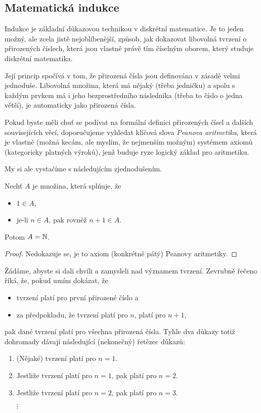\subsection{Matematická indukce}
\label{ssec:matematicka-indukce}

Indukce je základní důkazovou technikou v diskrétní matematice. Je to jeden
možný, ale zcela jistě nejoblíbenější, způsob, jak dokazovat libovolná tvrzení o
přirozených číslech, která jsou vlastně právě tím číselným oborem, který studuje
diskrétní matematika.

Její princip spočívá v tom, že přirozená čísla jsou definována v zásadě velmi
jednoduše. Libovolná množina, která má nějaký  (třeba
jedničku) a spolu s každým prvkem má i jeho bezprostředního následníka (třeba to
číslo o jedna větší), je automaticky  jako přirozená čísla.

Pokud byste měli chuť se podívat na formální definici přirozených čísel a
dalších souvisejících věcí, doporučujeme vyhledat klíčová slova \emph{Peanova
aritmetika}, která je vlastně (možná kecám, ale myslím, že nejmenším možným)
systémem axiomů (kategoricky platných výroků), jenž buduje ryze logický základ
pro aritmetiku.

My si ale vystačíme s následujícím zjednodušením.

\begin{claim}
 Nechť $A$ je množina, která splňuje, že
 \begin{itemize}
  \item $1 \in A$,
  \item je-li $n \in A$, pak rovněž $n+1 \in A$.
 \end{itemize}
 Potom $A = \mathbb{N}$.
\end{claim}
\begin{proof}
 Nedokazuje se, je to axiom (konkrétně pátý) Peanovy aritmetiky.
\end{proof}

Žádáme, abyste si dali chvíli a zamysleli nad významem tvrzení. Zevrubně řečeno
říká, že, pokud umím dokázat, že
\begin{itemize}
 \item tvrzení platí pro první přirozené číslo a
 \item za předpokladu, že tvrzení platí pro $n$, platí pro $n + 1$,
\end{itemize}
pak dané tvrzení platí pro všechna přirozená čísla. Tyhle dva důkazy totiž
dohromady dávají následující (nekonečný) řetězec důkazů:
\begin{enumerate}
 \item (Nějaké) tvrzení platí pro $n = 1$.
 \item Jestliže tvrzení platí pro $n = 1$, pak platí pro $n = 2$.
 \item Jestliže tvrzení platí pro $n = 2$, pak platí pro $n = 3$.

 \centering $\vdots$
\end{enumerate}

